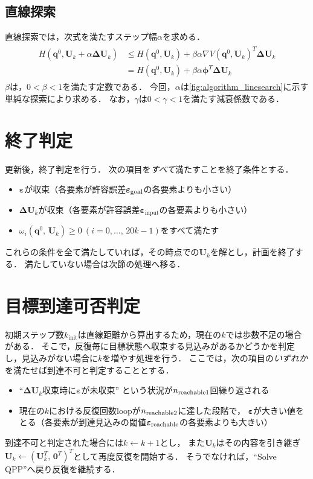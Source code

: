 \documentclass[autodetect-engine,dvipdfmx-if-dvi,ja=standard,a4j,jbase=11pt,magstyle=nomag*]{bxjsreport}
\begin{document}
\subsection{直線探索}
直線探索では，次式を満たすステップ幅$\alpha$を求める．
\begin{align}
    \label{eq:armijo}
    \begin{aligned}
        H \left( \bm{q}^0 , \bm{U}_k + \alpha \bm{\Delta U}_k \right) & \leq H \left( \bm{q}^0 , \bm{U}_k \right) + \beta \alpha {\nabla V \left( \bm{q}^0 , \bm{U}_k  \right)}^T \bm{\Delta U}_k \\
                                                                      &   =  H \left( \bm{q}^0 , \bm{U}_k \right) + \beta \alpha \bm{\phi}^T \bm{\Delta U}_k
    \end{aligned}
\end{align}
$\beta$は，$0 < \beta < 1$を満たす定数である．
今回，$\alpha$は\cref{fig:algorithm_linesearch}に示す単純な探索により求める．
なお，$\gamma$は$0 < \gamma < 1$を満たす減衰係数である．


\section{終了判定}
更新後，終了判定を行う．
次の項目を\emph{すべて}満たすことを終了条件とする．
\begin{itemize}
    \item   $\bm{\varepsilon}$が収束（各要素が許容誤差$\bm{\varepsilon}_{\mathrm{goal}}$の各要素よりも小さい）
    \item   $\bm{\Delta U}_k$が収束（各要素が許容誤差$\bm{\varepsilon}_{\mathrm{input}}$の各要素よりも小さい）
    \item   $\omega_i(\bm{q}^0 ,\, \bm{U}_k) \geq 0 \ (i = 0 , \dots ,\, 20k - 1)$をすべて満たす
\end{itemize}
これらの条件を全て満たしていれば，その時点での$\bm{U}_k$を解とし，計画を終了する．
満たしていない場合は次節の処理へ移る．

\section{目標到達可否判定}
初期ステップ数$k_\mathrm{init}$は直線距離から算出するため，現在の$k$では歩数不足の場合がある．
そこで，反復毎に目標状態へ収束する見込みがあるかどうかを判定し，見込みがない場合に$k$を増やす処理を行う．
ここでは，次の項目の\emph{いずれか}を満たせば到達不可と判定することとする．
\begin{itemize}
    \item   ``$\bm{\Delta U}_k$収束時に$\bm{\varepsilon}$が未収束'' という状況が$n_{\mathrm{reachable}1}$回繰り返される
    \item   現在の$k$における反復回数$\mathrm{loop}$が$n_{\mathrm{reachable}2}$に達した段階で，
   $\bm{\varepsilon}$が大きい値をとる（各要素が到達見込みの閾値$\bm{\varepsilon}_{\mathrm{reachable}}$の各要素よりも大きい）
\end{itemize}
到達不可と判定された場合には$k \gets k + 1$とし，
また$\bm{U}_k$はその内容を引き継ぎ$\bm{U}_k \gets ( \bm{U}_k^T ,\, \bm{0}^T )^T$として再度反復を開始する．
そうでなければ，``Solve QPP''へ戻り反復を継続する．
\end{document}
